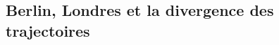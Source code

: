 

%
%



\subsection{Berlin, Londres et la divergence des trajectoires}\label{subsec:trajectoires_europe}

